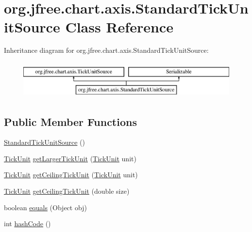 \hypertarget{classorg_1_1jfree_1_1chart_1_1axis_1_1_standard_tick_unit_source}{}\section{org.\+jfree.\+chart.\+axis.\+Standard\+Tick\+Unit\+Source Class Reference}
\label{classorg_1_1jfree_1_1chart_1_1axis_1_1_standard_tick_unit_source}
Inheritance diagram for org.\+jfree.\+chart.\+axis.\+Standard\+Tick\+Unit\+Source\+:\begin{figure}[H]
\begin{center}
\leavevmode
\includegraphics[height=2.000000cm]{classorg_1_1jfree_1_1chart_1_1axis_1_1_standard_tick_unit_source}
\end{center}
\end{figure}
\subsection*{Public Member Functions}
\begin{DoxyCompactItemize}
\item 
\mbox{\hyperlink{classorg_1_1jfree_1_1chart_1_1axis_1_1_standard_tick_unit_source_ab41096777ce0e6d2f35ccad0f2c54d69}{Standard\+Tick\+Unit\+Source}} ()
\item 
\mbox{\hyperlink{classorg_1_1jfree_1_1chart_1_1axis_1_1_tick_unit}{Tick\+Unit}} \mbox{\hyperlink{classorg_1_1jfree_1_1chart_1_1axis_1_1_standard_tick_unit_source_a0bb7142a99b046b49fd9c902adfae64a}{get\+Larger\+Tick\+Unit}} (\mbox{\hyperlink{classorg_1_1jfree_1_1chart_1_1axis_1_1_tick_unit}{Tick\+Unit}} unit)
\item 
\mbox{\hyperlink{classorg_1_1jfree_1_1chart_1_1axis_1_1_tick_unit}{Tick\+Unit}} \mbox{\hyperlink{classorg_1_1jfree_1_1chart_1_1axis_1_1_standard_tick_unit_source_a3b8cc0c89ecd3bf00acbd1368a571190}{get\+Ceiling\+Tick\+Unit}} (\mbox{\hyperlink{classorg_1_1jfree_1_1chart_1_1axis_1_1_tick_unit}{Tick\+Unit}} unit)
\item 
\mbox{\hyperlink{classorg_1_1jfree_1_1chart_1_1axis_1_1_tick_unit}{Tick\+Unit}} \mbox{\hyperlink{classorg_1_1jfree_1_1chart_1_1axis_1_1_standard_tick_unit_source_a93fbb960c8e9c54bef76b7e147427f9d}{get\+Ceiling\+Tick\+Unit}} (double size)
\item 
boolean \mbox{\hyperlink{classorg_1_1jfree_1_1chart_1_1axis_1_1_standard_tick_unit_source_a1a892c24e4f31504b5bfb2a1c1128ea5}{equals}} (Object obj)
\item 
int \mbox{\hyperlink{classorg_1_1jfree_1_1chart_1_1axis_1_1_standard_tick_unit_source_ad4312864bbb2940551d51132802deb41}{hash\+Code}} ()
\end{DoxyCompactItemize}


